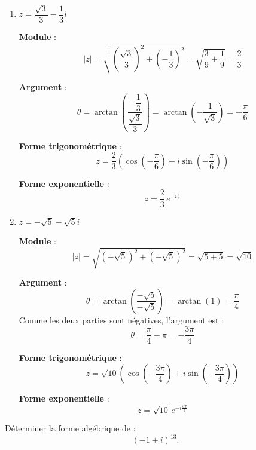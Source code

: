 \documentclass[a4paper,12pt]{article}
\begin{document}
\begin{solutionbox}
\begin{enumerate}
    \textbf{Forme trigonométrique} :
    \[
    z = 2 \left( \cos\left( \dfrac{\pi}{3} \right) + i\sin\left( \dfrac{\pi}{3} \right) \right)
    \]

    \textbf{Forme exponentielle} :
    \[
    z = 2\, e^{i\frac{\pi}{3}}
    \]

    \item \( z = \dfrac{\sqrt{3}}{3} - \dfrac{1}{3}i \)

    \textbf{Module} :
    \[
    |z| = \sqrt{\left( \dfrac{\sqrt{3}}{3} \right)^2 + \left( -\dfrac{1}{3} \right)^2} = \sqrt{ \dfrac{3}{9} + \dfrac{1}{9} } = \dfrac{2}{3}
    \]

    \textbf{Argument} :
    \[
    \theta = \arctan\left( \dfrac{ -\dfrac{1}{3} }{ \dfrac{\sqrt{3}}{3} } \right) = \arctan\left( -\dfrac{1}{\sqrt{3}} \right) = -\dfrac{\pi}{6}
    \]

    \textbf{Forme trigonométrique} :
    \[
    z = \dfrac{2}{3} \left( \cos\left( -\dfrac{\pi}{6} \right) + i\sin\left( -\dfrac{\pi}{6} \right) \right)
    \]

    \textbf{Forme exponentielle} :
    \[
    z = \dfrac{2}{3}\, e^{-i\frac{\pi}{6}}
    \]

    \item \( z = -\sqrt{5} - \sqrt{5}i \)

    \textbf{Module} :
    \[
    |z| = \sqrt{ (-\sqrt{5})^2 + (-\sqrt{5})^2 } = \sqrt{5 + 5} = \sqrt{10}
    \]

    \textbf{Argument} :
    \[
    \theta = \arctan\left( \dfrac{ -\sqrt{5} }{ -\sqrt{5} } \right) = \arctan(1) = \dfrac{\pi}{4}
    \]
    Comme les deux parties sont négatives, l'argument est :
    \[
    \theta = \dfrac{\pi}{4} - \pi = -\dfrac{3\pi}{4}
    \]

    \textbf{Forme trigonométrique} :
    \[
    z = \sqrt{10} \left( \cos\left( -\dfrac{3\pi}{4} \right) + i\sin\left( -\dfrac{3\pi}{4} \right) \right)
    \]

    \textbf{Forme exponentielle} :
    \[
    z = \sqrt{10}\, e^{-i\frac{3\pi}{4}}
    \]
\end{enumerate}
\end{solutionbox}

\begin{tcolorbox}[title=Exercice 3 - {[}Calculer{]}]
Déterminer la forme algébrique de :
\[
(-1 + i)^{13}.
\]
\end{tcolorbox}
\end{document}
